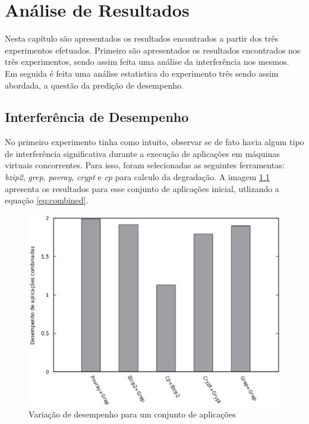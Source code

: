 \chapter{Análise de Resultados}
\label{cap:resultados}
Nesta capítulo são apresentados os resultados encontrados a partir dos três experimentos efetuados. Primeiro são apresentados os resultados encontrados  nos três experimentos, sendo assim feita uma análise da interferência nos mesmos. Em seguida é feita uma análise estatistica do experimento três sendo assim abordada, a questão da predição de desempenho.

\section{Interferência de Desempenho}
No primeiro experimento tinha como intuito, observar se de fato havia algum tipo de interferência significativa durante a execução de aplicações em máquinas virtuais concorrentes. Para isso, foram selecionadas as seguintes ferramentas: \textit{bzip2}, \textit{grep}, \textit{povray}, \textit{crypt} e \textit{cp} para calculo da degradação. A imagem \ref{first_experiment} apresenta os resultados para esse conjunto de aplicações inicial, utlizando a equação \ref{eq:combined}. 

\begin{figure}[!htb]
\centering
\includegraphics [keepaspectratio=true,scale=0.65]{graficos/exp1.eps}
\caption{Variação de desempenho para um conjunto de aplicações}
\label{first_experiment}
\end{figure} 

